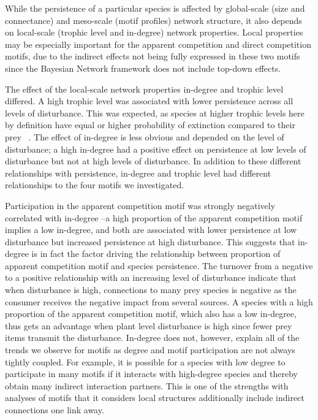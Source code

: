 \documentclass[12pt]{article}
\begin{document}
\begin{spacing}{2.0}
While the persistence of a particular species is affected by global-scale (size and connectance) and meso-scale (motif profiles) network structure, it also depends on local-scale (trophic level and in-degree) network properties.
Local properties may be especially important for the apparent competition and direct competition motifs, due to the indirect effects not being fully expressed in these two motifs since the Bayesian Network framework does not include top-down effects. 

The effect of the local-scale network properties in-degree and trophic level differed.
A high trophic level was associated with lower persistence across all levels of disturbance. This was expected, as species at higher trophic levels here by definition have equal or higher probability of extinction compared to their prey ~\citep{Eklof2013}.
The effect of in-degree is less obvious and depended on the level of disturbance; a high in-degree had a positive effect on persistence at low levels of disturbance but not at high levels of disturbance.
In addition to these different relationships with persistence, in-degree and trophic level had different relationships to the four motifs we investigated.

Participation in the apparent competition motif was strongly negatively correlated with in-degree --a high proportion of the apparent competition motif implies a low in-degree, and both are associated with lower persistence at low disturbance but increased persistence at high disturbance. This suggests that in-degree is in fact the factor driving the relationship between proportion of apparent competition motif and species persistence. The turnover from a negative to a positive relationship with an increasing level of disturbance indicate that when disturbance is high, connections to many prey species is negative as the consumer receives the negative impact from several sources. A species with a high proportion of the apparent competition motif, which also has a low in-degree, thus gets an advantage when plant level disturbance is high since fewer prey items transmit the disturbance.
In-degree does not, however, explain all of the trends we observe for motifs as degree and motif participation are not always tightly coupled.
For example, it is possible for a species with low degree to participate in many motifs if it interacts with high-degree species and thereby obtain many indirect interaction partners. This is one of the strengths with analyses of motifs that it considers local structures additionally include indirect connections one link away.


\end{spacing}
\end{document}
